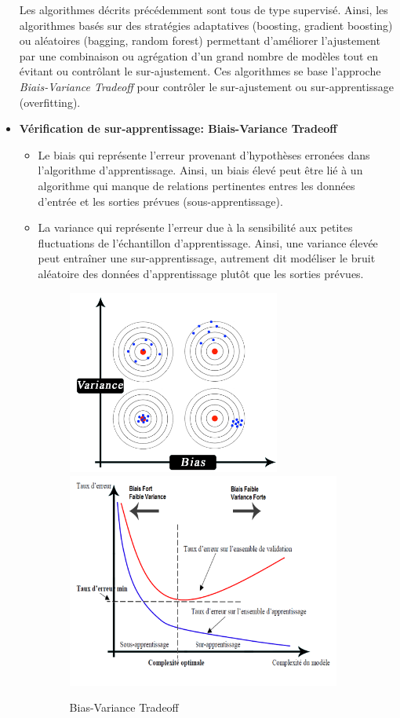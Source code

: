 \begin{itemize}
Les algorithmes décrits précédemment sont tous de type supervisé. Ainsi, les algorithmes basés sur des stratégies adaptatives
(boosting, gradient boosting) ou aléatoires (bagging, random forest) permettant d’améliorer l’ajustement par une combinaison
ou agrégation d’un grand nombre de modèles tout en évitant ou contrôlant le sur-ajustement. Ces algorithmes se base l'approche \textit{Biais-Variance Tradeoff} pour contrôler le sur-ajustement ou sur-apprentissage (overfitting).\\

\item[\ding{233}] \textbf{Vérification de sur-apprentissage: Biais-Variance Tradeoff}\\

    \begin{itemize}
        \item[\ding{109}] Le biais qui représente l’erreur provenant d’hypothèses erronées dans l’algorithme
        d’apprentissage. Ainsi, un biais élevé peut être lié à un algorithme qui manque de relations pertinentes entres les données d’entrée et les sorties prévues (sous-apprentissage).\\
        
        \item[\ding{109}] La variance qui représente l’erreur due à la sensibilité aux petites fluctuations de l’échantillon d’apprentissage. Ainsi, une variance élevée peut entraîner une sur-apprentissage, autrement dit modéliser le bruit aléatoire des données d’apprentissage plutôt que les sorties prévues.
            \begin{figure}[!htb]
            \includegraphics[width=7cm]{img/biasV.png}\hfill
            \includegraphics[width=9cm]{img/biasV3.png}
            \caption{Bias-Variance Tradeoff}\label{biasVar}
            \end{figure}
    \end{itemize}
\end{itemize}





